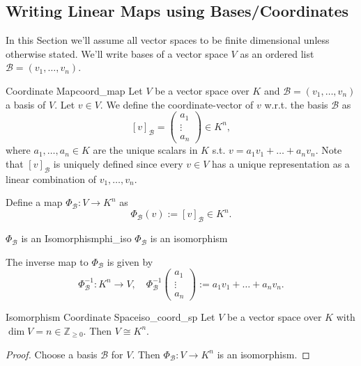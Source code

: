 \subsection{Writing Linear Maps using Bases/Coordinates}
In this Section we'll assume all vector spaces to be finite dimensional unless otherwise stated. We'll write bases of a vector space $V$ as an ordered list $\mathcal{B} = (v_1, \hdots , v_n)$.

\begin{definition}{Coordinate Map}{coord_map}
	Let $V$ be a vector space over $K$ and $\mathcal{B} = (v_1, \hdots , v_n)$ a basis of $V$. Let $v\in V$. We define the coordinate-vector of $v$ w.r.t. the basis $\mathcal{B}$ as
	\[
	[v]_{\mathcal{B}} = \begin{pmatrix}
		a_1\\
		\vdots\\
		a_n
	\end{pmatrix} \in K^n,
	\]
	where $a_1, \hdots , a_n \in K$ are the unique scalars in $K$ s.t. $v = a_1v_1 + \hdots + a_n v_n$. Note that $[v]_{\mathcal{B}}$ is uniquely defined since every $v \in V$ has a unique representation as a linear combination of $v_1, \hdots , v_n$.
	
	Define a map $\Phi_\mathcal{B}: V \to K^n$ as 
	\[
	\Phi_{\mathcal{B}}(v) := [v]_{\mathcal{B}} \in K^n.
	\]
\end{definition}

\begin{proposition}{$\Phi_{\mathcal{B}}$ is an Isomorphism}{phi_iso}
	$\Phi_{\mathcal{B}}$ is an isomorphism
\end{proposition}

\begin{remark}
	The inverse map to $\Phi_{\mathcal{B}}$ is given by
	\[
	\Phi^{-1}_{\mathcal{B}} :K^n \to V, \quad \Phi^{-1}_{\mathcal{B}}\begin{pmatrix}
		a_1\\
		\vdots\\
		a_n
	\end{pmatrix} := a_1 v_1 + \hdots + a_n v_n.
	\]
\end{remark}

\begin{corollary}{Isomorphism Coordinate Space}{iso_coord_sp}
	Let $V$ be a vector space over $K$ with $\dim V = n \in \mathbb{Z}_{\geq 0}$. Then $V \cong K^n$.
\end{corollary}
\begin{proof}
	Choose a basis $\mathcal{B}$ for $V$. Then $\Phi_{\mathcal{B}}:V \to K^n$ is an isomorphism.
\end{proof}

